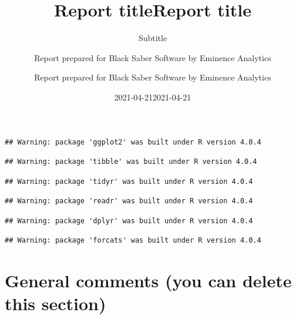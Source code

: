 \documentclass[
          english,
          paper=a4,
              ,captions=tableheading
  ]{scrartcl}
\title{Report title}
\subtitle{Subtitle}
\author{Report prepared for Black Saber Software by Eminence Analytics}
\date{2021-04-21}
\title{Report title}
\author{Report prepared for Black Saber Software by Eminence Analytics}
\date{2021-04-21}
\begin{document}
\begin{titlepage}
\afterpage{\restorepagecolor}
\newcommand{\colorRule}[3][black]{\textcolor[HTML]{#1}{\rule{#2}{#3}}}
\end{titlepage}
\restoregeometry




{
\setcounter{tocdepth}{2}
\tableofcontents
}
\begin{verbatim}
## Warning: package 'ggplot2' was built under R version 4.0.4
\end{verbatim}

\begin{verbatim}
## Warning: package 'tibble' was built under R version 4.0.4
\end{verbatim}

\begin{verbatim}
## Warning: package 'tidyr' was built under R version 4.0.4
\end{verbatim}

\begin{verbatim}
## Warning: package 'readr' was built under R version 4.0.4
\end{verbatim}

\begin{verbatim}
## Warning: package 'dplyr' was built under R version 4.0.4
\end{verbatim}

\begin{verbatim}
## Warning: package 'forcats' was built under R version 4.0.4
\end{verbatim}

\hypertarget{general-comments-you-can-delete-this-section}{%
\section{General comments (you can delete this
section)}\label{general-comments-you-can-delete-this-section}}
\end{document}
